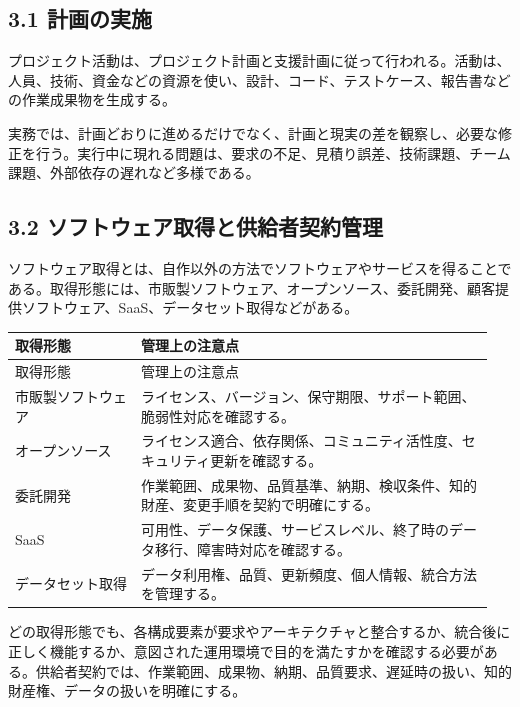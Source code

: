\documentclass[a4paper,11pt]{ltjsarticle}
\begin{document}
\subsection{3.1 計画の実施}
プロジェクト活動は、プロジェクト計画と支援計画に従って行われる。活動は、人員、技術、資金などの資源を使い、設計、コード、テストケース、報告書などの作業成果物を生成する。

実務では、計画どおりに進めるだけでなく、計画と現実の差を観察し、必要な修正を行う。実行中に現れる問題は、要求の不足、見積り誤差、技術課題、チーム課題、外部依存の遅れなど多様である。

\subsection{3.2 ソフトウェア取得と供給者契約管理}
ソフトウェア取得とは、自作以外の方法でソフトウェアやサービスを得ることである。取得形態には、市販製ソフトウェア、オープンソース、委託開発、顧客提供ソフトウェア、SaaS、データセット取得などがある。

\begin{longtable}{>{\raggedright\arraybackslash}p{0.25\linewidth}>{\raggedright\arraybackslash}p{0.70\linewidth}}
\toprule
取得形態 & 管理上の注意点 \\
\midrule
\endfirsthead
\toprule
取得形態 & 管理上の注意点 \\
\midrule
\endhead
市販製ソフトウェア & ライセンス、バージョン、保守期限、サポート範囲、脆弱性対応を確認する。 \\
オープンソース & ライセンス適合、依存関係、コミュニティ活性度、セキュリティ更新を確認する。 \\
委託開発 & 作業範囲、成果物、品質基準、納期、検収条件、知的財産、変更手順を契約で明確にする。 \\
SaaS & 可用性、データ保護、サービスレベル、終了時のデータ移行、障害時対応を確認する。 \\
データセット取得 & データ利用権、品質、更新頻度、個人情報、統合方法を管理する。 \\
\bottomrule
\end{longtable}

どの取得形態でも、各構成要素が要求やアーキテクチャと整合するか、統合後に正しく機能するか、意図された運用環境で目的を満たすかを確認する必要がある。供給者契約では、作業範囲、成果物、納期、品質要求、遅延時の扱い、知的財産権、データの扱いを明確にする。

\begin{center}
\end{center}
\end{document}
